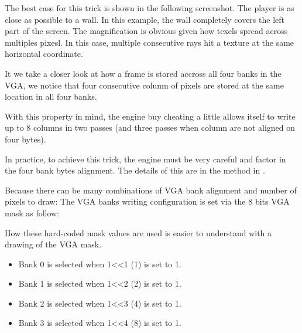 \par
The best case for this trick is shown in the following screenshot. The player is as close as possible to a wall. In this example, the wall completely covers the left part of the screen. The magnification is obvious given how texels spread across multiples pixesl. In this case, multiple consecutive rays hit a texture at the same horizontal coordinate.\\
\begin{figure}[H]
 \centering
\end{figure}
It we take a closer look at how a frame is stored accross all four banks in the VGA, we notice that four consecutive column of pixels are stored at the same location in all four banks.\\
\par
With this property in mind, the engine buy cheating a little allows itself to write up to 8 columns in two passes (and three passes when column are not aligned on four bytes).
 \par
  \begin{minipage}{\textwidth}
 
\centering
\vspace*{0.5cm}
\centering


 \end{minipage}

\par

In practice, to achieve this trick, the engine must be very careful and factor in the four bank bytes alignment. The details of this are in the method  in .\\
\par 
\begin{minipage}{\textwidth}

\end{minipage}
Because there can be many combinations of VGA bank alignment and number of pixels to draw:
The VGA banks writing configuration is set via the 8 bits VGA mask as follow:\\
\par
 \par
 \begin{minipage}{\textwidth}

\end{minipage}
How these hard-coded mask values are used is easier to understand with a drawing of the VGA mask. 
\begin{itemize}
\item Bank 0 is selected when 1<<1 (1) is set to 1.
\item Bank 1 is selected when 1<<2 (2) is set to 1.
\item Bank 2 is selected when 1<<3 (4) is set to 1.
\item Bank 3 is selected when 1<<4 (8) is set to 1.
\end{itemize}
\par


